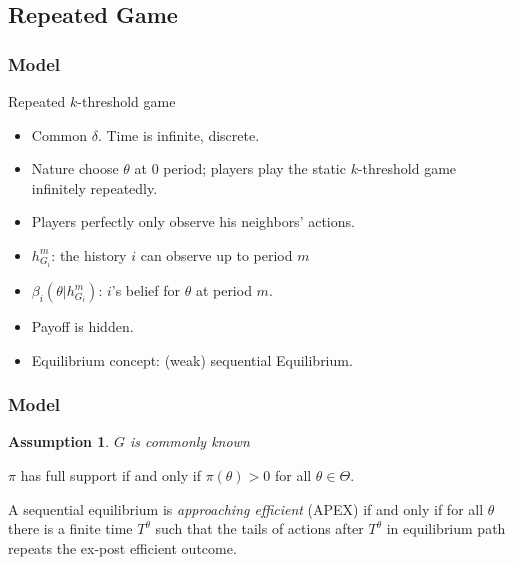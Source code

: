 \documentclass[10pt]{beamer}
\newtheorem{assumption}{Assumption}[section]
\begin{document}
\subsection{Repeated Game}
\begin{frame}
  \frametitle{Model}
Repeated $k$-threshold game
  \begin{itemize}

  \item Common $\delta$. Time is infinite, discrete.
  \item Nature choose $\theta$ at $0$ period; players play the static $k$-threshold game infinitely repeatedly.
     \item Players perfectly only observe his neighbors' actions. 
    \item $h^{m}_{G_i}$: the history $i$ can observe up to period $m$
   \item $\beta_i(\theta|h^{m}_{G_i})$: $i$'s belief for $\theta$ at period $m$. 
  \item Payoff is hidden.
    \item Equilibrium concept: (weak) sequential Equilibrium.


  \end{itemize}

\end{frame}



\begin{frame}
  \frametitle{Model}

\begin{assumption}
$G$ is commonly known
\end{assumption}

\begin{definition}
$\pi$ has full support if and only if $\pi(\theta)>0$ for all $\theta\in \Theta$.
\end{definition}
\begin{definition}\label{Def_expost_efficient}
A sequential equilibrium is \textit{approaching efficient} (APEX) if and only if for all $\theta$ there is a finite time $T^{\theta}$ such that the tails of actions after $T^{\theta}$ in equilibrium path repeats the ex-post efficient outcome.
\end{definition}
 


\end{frame}
\end{document}
